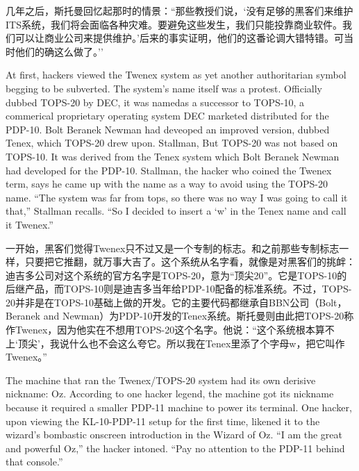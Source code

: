\ifdefined\chs
几年之后，斯托曼回忆起那时的情景：``那些教授们说，`没有足够的黑客们来维护ITS系统，我们将会面临各种灾难。要避免这些发生，我们只能投靠商业软件。我们可以让商业公司来提供维护。'后来的事实证明，他们的这番论调大错特错。可当时他们的确这么做了。''
\fi

\ifdefined\eng
At first, hackers viewed the Twenex system as yet another authoritarian symbol begging to be subverted. The system's name itself was a protest. Officially dubbed TOPS-20 by DEC, it was \ifdefined\vtwo named\fi as a successor to TOPS-10, a \ifdefined\vone commerical \fi\ifdefined\vtwo proprietary \fi operating system DEC \ifdefined\vone marketed \fi\ifdefined\vtwo distributed \fi for the PDP-10. \ifdefined\vone Bolt Beranek Newman had deveoped an improved version, dubbed Tenex, which TOPS-20 drew upon. Stallman, \fi\ifdefined\vtwo But TOPS-20 was not based on TOPS-10.  It was derived from the Tenex system which Bolt Beranek Newman had developed for the PDP-10. Stallman, \fi the hacker who coined the Twenex term, says he came up with the name as a way to avoid using the TOPS-20 name. ``The system was far from tops, so there was no way I was going to call it that,'' Stallman recalls. ``So I decided to insert a `w' in the Tenex name and call it Twenex.''
\fi

\ifdefined\chs
一开始，黑客们觉得Twenex只不过又是一个专制的标志。和之前那些专制标志一样，只要把它推翻，就万事大吉了。这个系统从名字看，就像是对黑客们的挑衅：迪吉多公司对这个系统的官方名字是TOPS-20，意为``顶尖20''。它是TOPS-10的后继产品，而TOPS-10则是迪吉多当年给PDP-10配备的标准系统。不过，TOPS-20并非是在TOPS-10基础上做的开发。它的主要代码都继承自BBN公司（Bolt，Beranek and Newman）为PDP-10开发的Tenex系统。斯托曼则由此把TOPS-20称作Twenex，因为他实在不想用TOPS-20这个名字。他说：``这个系统根本算不上`顶尖'，我说什么也不会这么夸它。所以我在Tenex里添了个字母w，把它叫作Twenex。''
\fi

\ifdefined\eng
The machine that ran the Twenex/TOPS-20 system had its own derisive nickname: Oz. According to one hacker legend, the machine got its nickname because it required a smaller PDP-11 machine to power its terminal. One hacker, upon viewing the KL-10-PDP-11 setup for the first time, likened it to the wizard's bombastic onscreen introduction in the Wizard of Oz. ``I am the great and powerful Oz,'' the hacker intoned. ``Pay no attention to the PDP-11 behind that console.''
\fi

